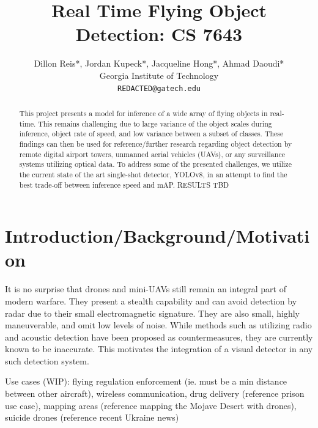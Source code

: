 \documentclass[10pt,twocolumn,letterpaper]{article}
\begin{document}
\title{Real Time Flying Object Detection: CS 7643}

\author{Dillon Reis*, Jordan Kupeck*, Jacqueline Hong*, Ahmad Daoudi*\\
Georgia Institute of Technology\\
{\tt\small {REDACTED}@gatech.edu}
}

\maketitle

\begin{abstract}
   This project presents a model for inference of a wide array of flying objects in real-time. 
   This remains challenging due to large variance of the object scales during inference, object rate of speed, 
   and low variance between a subset of classes. These findings can then be used for reference/further research 
   regarding object detection by remote digital airport towers, unmanned aerial vehicles (UAVs), or any surveillance 
   systems utilizing optical data. To address some of the presented challenges, we utilize the current state of the art 
   single-shot detector, YOLOv8, in an attempt to find the best trade-off between inference speed and mAP. RESULTS TBD
\end{abstract}

\section{Introduction/Background/Motivation}
It is no surprise that drones and mini-UAVs still remain an integral part of modern warfare. They present a stealth capability 
and can avoid detection by radar due to their small electromagnetic signature. They are also small, highly maneuverable, and 
omit low levels of noise. While methods such as utilizing radio and acoustic detection have been proposed as countermeasures, they 
are currently known to be inaccurate. This motivates the integration of a visual detector in any such detection system.


Use cases (WIP): flying regulation enforcement (ie. must be a min distance between other aircraft), wireless communication, drug delivery (reference prison use case), mapping areas (reference mapping the Mojave Desert with drones), suicide drones (reference recent Ukraine news)
\end{document}
